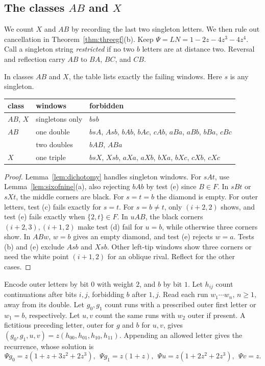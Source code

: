 \subsection{\texorpdfstring{The classes $AB$ and $X$}{The classes AB and X}}\label{app:threegf}

We count $X$ and $AB$ by recording the last two singleton letters.
We then rule out cancellation in Theorem~\ref{thm:threegf}(b).
Keep $\Psi=LN=1-2z-4z^3-4z^4$. Call a singleton string
\emph{restricted} if no two $b$ letters are at distance two.
Reversal and reflection carry $AB$ to $BA$, $BC$, and $CB$.

\begin{lemma}\label{lem:threewindows}
In classes $AB$ and $X$, the table lists exactly the failing windows.
Here $s$ is any singleton.
\begin{center}\small
\begin{tabular}{@{}lll@{}}
\toprule
class & windows & forbidden \\
\midrule
$AB$, $X$ & singletons only & $bsb$ \\
$AB$ & one double & $bsA$, $Asb$, $bAb$, $bAc$, $cAb$, $aBa$, $aBb$, $bBa$, $cBc$ \\
 & two doubles & $bAB$, $ABa$ \\
$X$ & one triple & $bsX$, $Xsb$, $aXa$, $aXb$, $bXa$, $bXc$, $cXb$, $cXc$ \\
\bottomrule
\end{tabular}
\end{center}
\end{lemma}

\begin{proof}
Lemma~\ref{lem:dichotomy} handles singleton windows.
For $sAt$, use Lemma~\ref{lem:sixofnine}(a), also rejecting $bAb$
by test (e) since $B\in F$.
In $sBt$ or $sXt$, the middle corners are black. For $s=t=b$ the
diamond is empty. For outer letters, test (c) fails exactly for $s=t$.
For $s=b\ne t$, only $(i+2,2)$ shows, and test (e) fails exactly
when $\{2,t\}\in F$.
In $uAB$, the black corners $(i+2,3),(i+1,2)$ make test (d) fail
for $u=b$, while otherwise three corners show.
In $ABw$, $w=b$ gives an empty diamond, and test (e) rejects $w=a$.
Tests (b) and (e) exclude $Asb$ and $Xsb$.
Other left-tip windows show three corners or need the white point
$(i+1,2)$ for an oblique rival. Reflect for the other cases.
\end{proof}

Encode outer letters by bit $0$ with weight $2$, and $b$ by bit $1$.
Let $h_{ij}$ count continuations after bits $i,j$, forbidding $b$ after $1,j$.
Read each run $w_1\cdots w_n$, $n\ge1$, away from its double.
Let $g_0,g_1$ count runs with a prescribed outer first letter or $w_1=b$,
respectively. Let $u,v$ count the same runs with $w_2$ outer if present.
A fictitious preceding letter, outer for $g$ and $b$ for $u,v$,
gives $(g_0,g_1,u,v)=z(h_{00},h_{01},h_{10},h_{11})$.
Appending an allowed letter gives the recurrence, whose solution is
\begin{equation}\label{eq:runs}
\Psi g_0=z(1+z+3z^2+2z^3),\ \ \Psi g_1=z(1+z),\ \ \Psi u=z(1+2z^2+2z^3),\ \ \Psi v=z.
\end{equation}

